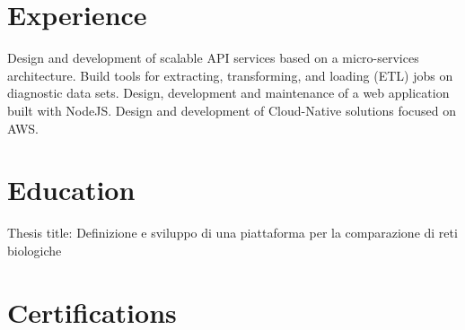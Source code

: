 \documentclass[letterpaper]{twentysecondcv} %
\begin{document}

\section{Experience}

\begin{twenty} %
	{
	    Design and development of scalable API services based on a micro-services architecture.
	    \newline
	    Build tools for extracting, transforming, and loading (ETL) jobs on diagnostic data sets.
    }
	\tw
	{
	    Design, development and maintenance of a web application built with NodeJS.
	    \newline 
	    Design and development of Cloud-Native solutions focused on AWS.
    }
\end{twenty}


\section{Education}

\begin{twenty} %
	{Thesis title: Definizione e sviluppo di una piattaforma per la comparazione di reti biologiche}
\end{twenty}


\section{Certifications}
\end{document}
